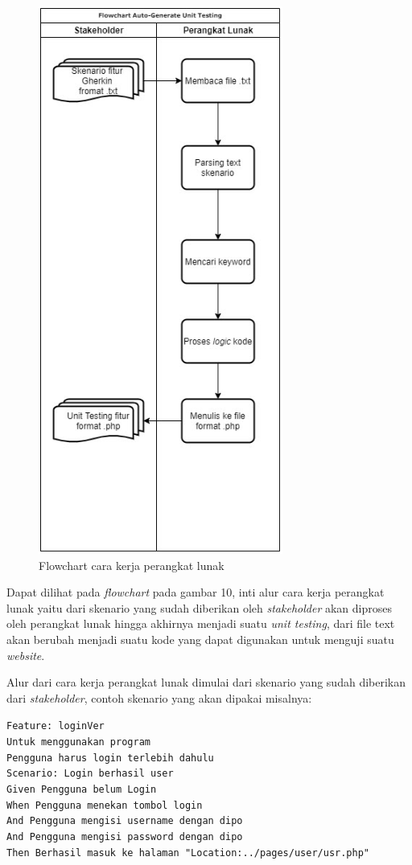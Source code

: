 \documentclass[a4paper,twoside]{article}
\begin{document}
\begin{enumerate}
\begin{figure}[h!]
			\includegraphics[scale=0.70]{../DokumenSkripsi/gambar/flowcharttesting}
			\centering
			\caption{Flowchart cara kerja perangkat lunak}
		\end{figure}

Dapat dilihat pada \textit{flowchart} pada gambar 10, inti alur cara kerja perangkat lunak yaitu dari skenario yang sudah diberikan oleh \textit{stakeholder} akan diproses oleh perangkat lunak hingga akhirnya menjadi suatu \textit{unit testing}, dari file text akan berubah menjadi suatu kode yang dapat digunakan untuk menguji suatu \textit{website}.

Alur dari cara kerja perangkat lunak dimulai dari skenario yang sudah diberikan dari \textit{stakeholder}, contoh skenario yang akan dipakai misalnya:

\texttt{Feature: loginVer\\
    Untuk menggunakan program\\
    Pengguna harus login terlebih dahulu\\
    Scenario: Login berhasil user\\
        Given Pengguna belum Login\\
        When Pengguna menekan tombol login\\
        And Pengguna mengisi username dengan dipo\\
        And Pengguna mengisi password dengan dipo\\
        Then Berhasil masuk ke halaman "Location:../pages/user/usr.php"}
     

\end{enumerate}
\end{document}
